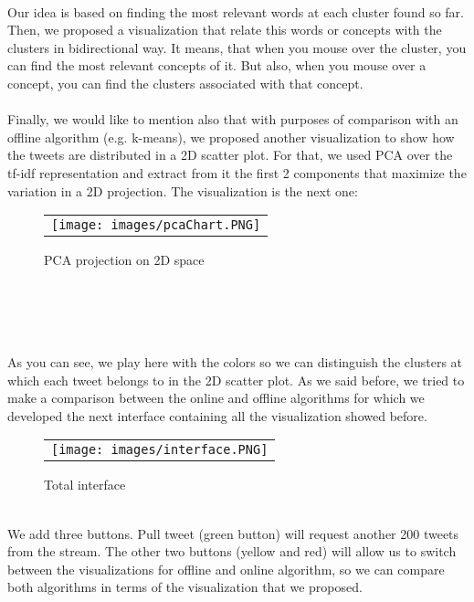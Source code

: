 \documentclass{article}
\begin{document}
\\
Our idea is based on finding the most relevant words at each cluster found so far. Then, we proposed a visualization that relate this words or concepts with the clusters in bidirectional way. It means, that when you mouse over the cluster, you can find the most relevant concepts of it. But also, when you mouse over a concept, you can find the clusters associated with that concept. 
\\
\\
Finally, we would like to mention also that with purposes of comparison with an offline algorithm (e.g. k-means), we proposed another visualization to show how the tweets are distributed in a 2D scatter plot. For that, we used PCA over the tf-idf representation and extract from it the first 2 components that maximize the variation in a 2D projection. The visualization is the next one:
\\
\begin{figure}[htb]
\hspace*{-90pt}
\centering
  \begin{tabular}{@{}c@{}}
    \texttt{[image: images/pcaChart.PNG]} 
    \hspace*{-80pt}
    &
  \end{tabular}
  \vspace{-5pt}
  \caption{PCA projection on 2D space}
\end{figure}
\\
\\
\\
\\

As you can see, we play here with the colors so we can distinguish the clusters at which each tweet belongs to in the 2D scatter plot. As we said before, we tried to make a comparison between the online and offline algorithms for which we developed the next interface containing all the visualization showed before.
\begin{figure}[htb]
\hspace*{-90pt}
\centering
  \begin{tabular}{@{}c@{}}
    \texttt{[image: images/interface.PNG]} 
    \hspace*{-80pt}
    &
  \end{tabular}
  \vspace{-5pt}
  \caption{Total interface}
\end{figure}
\\
We add three buttons. Pull tweet (green button) will request another 200 tweets from the stream. The other two buttons (yellow and red) will allow us to switch between the visualizations for offline and online algorithm, so we can compare both algorithms in terms of the visualization that we proposed.
\end{document}
